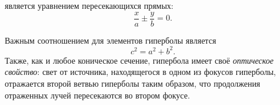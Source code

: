  является уравнением пересекающихся прямых:
\begin{equation}
	\frac{x}{a}\pm\frac{y}{b}=0.
\end{equation}

Важным соотношением для элементов гиперболы является
\begin{equation}
c^2=a^2+b^2.
\end{equation}
Также, как и любое коническое сечение, гипербола имеет своё {\itshape оптическое свойство}: свет от источника, находящегося в одном из фокусов гиперболы, отражается второй ветвью гиперболы таким образом, что продолжения отраженных лучей пересекаются во втором фокусе.
